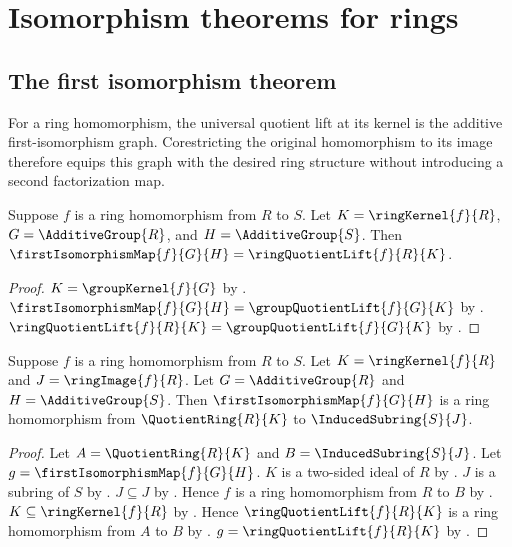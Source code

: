 





\section{Isomorphism theorems for rings}

\subsection{The first isomorphism theorem}

For a ring homomorphism, the universal quotient lift at its kernel is the
additive first-isomorphism graph.  Corestricting the original homomorphism to
its image therefore equips this graph with the desired ring structure without
introducing a second factorization map.

\begin{proposition}\label{ring_first_isomorphism_map_eq_ring_quotient_lift}
    Suppose $f$ is a ring homomorphism from $R$ to $S$.
    Let $K=\ringKernel{f}{R}$, $G=\AdditiveGroup{R}$, and
        $H=\AdditiveGroup{S}$.
    Then
        $\firstIsomorphismMap{f}{G}{H}
            =\ringQuotientLift{f}{R}{K}$.
\end{proposition}
\begin{proof}
    $K=\groupKernel{f}{G}$ by
        .
    $\firstIsomorphismMap{f}{G}{H}
        =\groupQuotientLift{f}{G}{K}$ by
        .
    $\ringQuotientLift{f}{R}{K}
        =\groupQuotientLift{f}{G}{K}$ by
        .
\end{proof}

\begin{theorem}\label{ring_first_isomorphism_map_hom}
    Suppose $f$ is a ring homomorphism from $R$ to $S$.
    Let $K=\ringKernel{f}{R}$ and $J=\ringImage{f}{R}$.
    Let $G=\AdditiveGroup{R}$ and $H=\AdditiveGroup{S}$.
    Then $\firstIsomorphismMap{f}{G}{H}$ is a ring homomorphism from
        $\QuotientRing{R}{K}$ to $\InducedSubring{S}{J}$.
\end{theorem}
\begin{proof}
    Let $A=\QuotientRing{R}{K}$ and $B=\InducedSubring{S}{J}$.
    Let $g=\firstIsomorphismMap{f}{G}{H}$.
    $K$ is a two-sided ideal of $R$ by
        .
    $J$ is a subring of $S$ by .
    $J\subseteq J$ by .
    Hence $f$ is a ring homomorphism from $R$ to $B$ by
        .
    $K\subseteq\ringKernel{f}{R}$ by .
    Hence $\ringQuotientLift{f}{R}{K}$ is a ring homomorphism
        from $A$ to $B$ by
        .
    $g=\ringQuotientLift{f}{R}{K}$ by
        .
\end{proof}

